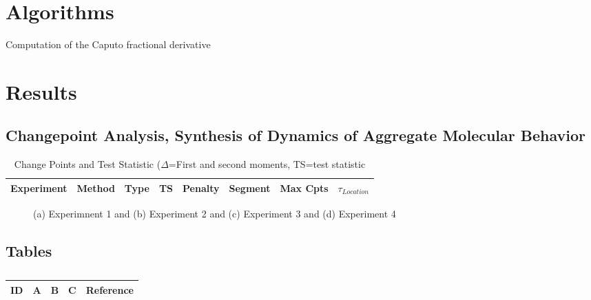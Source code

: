 \section{Algorithms}

\begin{algorithm}[H]
\footnotesize
\begin{algorithmic}[1]

\end{algorithmic}
\caption{Computation of the Caputo fractional derivative}
	\label{Algorithm_1}
\end{algorithm}

\section{Results}

\subsection{Changepoint Analysis, Synthesis of Dynamics of Aggregate Molecular Behavior}

\begin{table}[H]\tiny
  \caption{Change Points and Test Statistic ($\Delta$=First and second moments, TS=test statistic}
\begin{tabular}{rlp{0.7cm}lllll}
\hline	 
Experiment &Method & Type & TS & Penalty & Segment & Max Cpts & $\tau_{Location}$ \\
\hline
\hline
\end{tabular}
\end{table}

\begin{figure}[H]
\centering
\caption{ (a) Experimnent 1 and (b) Experiment 2 and (c) Experiment 3 and (d) Experiment 4 }
\label{fig:Figure1}
\end{figure}

\subsection{Tables}

\centering
\begin{table}[H]\footnotesize
	\caption{}
	\begin{tabular}{rp{1cm}p{2cm}p{3cm}p{1cm}}
		\hline
		ID & A & B & C & Reference \\
		\hline
		\hline
	\end{tabular}
\end{table}
\raggedright


